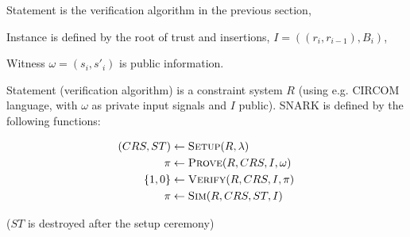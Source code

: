 \documentclass{article}
\begin{document}
Statement is the verification algorithm in the previous section,

Instance is defined by the root of trust and insertions, $I = ((r_i, r_{i-1}),B_i)$,

Witness $\omega = (s_i, s'_i)$ is public information.

Statement (verification algorithm) is a constraint system $R$ (using e.g. CIRCOM language, with $\omega$ as private input signals and $I$ public). SNARK is defined by the following functions:

\begin{align*}
(CRS, ST) &\gets \Call{Setup}{R, \lambda} \\
      \pi &\gets \Call{Prove}{R, CRS, I, \omega} \\
 \{1, 0\} &\gets \Call{Verify}{R, CRS, I, \pi} \\
      \pi &\gets \Call{Sim}{R, CRS, ST,I}
\end{align*}

($ST$ is destroyed after the setup ceremony)
\end{document}
